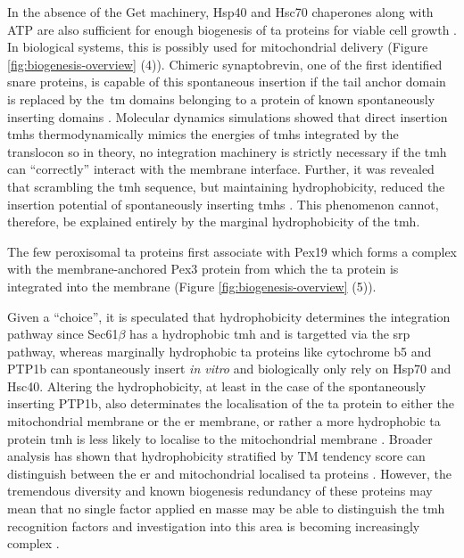 In the absence of the Get machinery, Hsp40 and Hsc70 chaperones along with ATP are also sufficient for enough biogenesis of \gls{ta} proteins for viable cell growth \cite{Rabu2008, Rabu2009, Ngosuwan2003, Colombo2009, Kemper2008, Meineke2008, Setoguchi2006}.
In biological systems, this is possibly used for mitochondrial delivery \cite{Kemper 2008} (Figure \ref{fig:biogenesis-overview} (4)).
Chimeric synaptobrevin, one of the first identified~ \gls{snare} proteins, is capable of this spontaneous insertion if the tail anchor domain is replaced by the~\gls{tm} domains belonging to a protein of known spontaneously inserting domains \cite{Nordlund2014}.
Molecular dynamics simulations showed that direct insertion \gls{tmh}s thermodynamically mimics the energies of \gls{tmh}s integrated by the translocon \cite{Ulmschneider2014} so in theory, no integration machinery is strictly necessary if the \gls{tmh} can ``correctly'' interact with the membrane interface.
Further, it was revealed that scrambling the \gls{tmh} sequence, but maintaining hydrophobicity, reduced the insertion potential of spontaneously inserting \gls{tmh}s \cite{Brambillasca2006}.
This phenomenon cannot, therefore, be explained entirely by the marginal hydrophobicity of the \gls{tmh}.

The few peroxisomal \gls{ta} proteins first associate with Pex19 which forms a complex with the membrane\--anchored Pex3 protein from which the \gls{ta} protein is integrated into the membrane \cite{Chen2014, Yagita2013, Costello2017}(Figure \ref{fig:biogenesis-overview} (5)).

Given a ``choice'', it is speculated that hydrophobicity determines the integration pathway since Sec61$\beta$ has a hydrophobic \gls{tmh} and is targetted via the \gls{srp} pathway, whereas marginally hydrophobic \gls{ta} proteins like cytochrome b5 and PTP1b can spontaneously insert \textit{in vitro} and biologically only rely on Hsp70 and Hsc40.
Altering the hydrophobicity, at least in the case of the spontaneously inserting PTP1b, also determinates the localisation of the \gls{ta} protein to either the mitochondrial membrane or the \gls{er} membrane, or rather a more hydrophobic \gls{ta} protein \gls{tmh} is less likely to localise to the mitochondrial membrane \cite{Fueller2015}.
Broader analysis has shown that hydrophobicity \cite{White1999} stratified by TM tendency score \cite{Zhao2009} can distinguish between the \gls{er} and mitochondrial localised \gls{ta} proteins \cite{Guna2018}.
However, the tremendous diversity and known biogenesis redundancy of these proteins may mean that no single factor applied en masse may be able to distinguish the \gls{tmh} recognition factors and investigation into this area is becoming increasingly complex \cite{Guna2018}.

